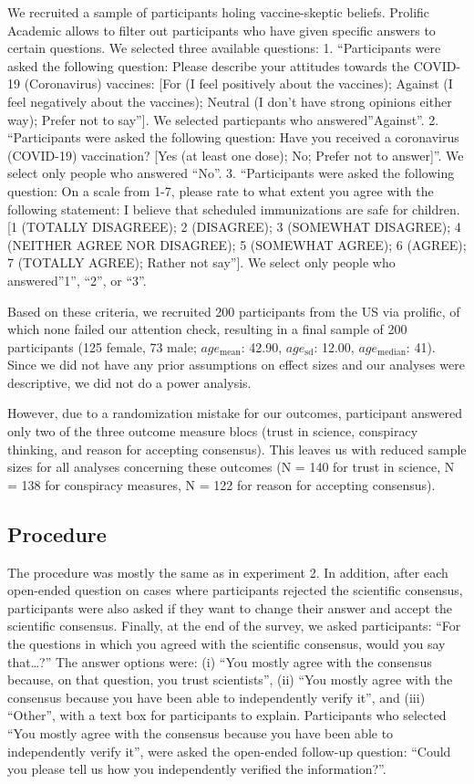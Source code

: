 \documentclass[
  doc,floatsintext]{apa6}
\begin{document}
We recruited a sample of participants holing vaccine-skeptic beliefs. Prolific Academic allows to filter out participants who have given specific answers to certain questions. We selected three available questions: 1. ``Participants were asked the following question: Please describe your attitudes towards the COVID-19 (Coronavirus) vaccines: {[}For (I feel positively about the vaccines); Against (I feel negatively about the vaccines); Neutral (I don't have strong opinions either way); Prefer not to say''{]}. We selected particpants who answered''Against''. 2. ``Participants were asked the following question: Have you received a coronavirus (COVID-19) vaccination? {[}Yes (at least one dose); No; Prefer not to answer{]}''. We select only people who answered ``No''. 3. ``Participants were asked the following question: On a scale from 1-7, please rate to what extent you agree with the following statement: I believe that scheduled immunizations are safe for children. {[}1 (TOTALLY DISAGREEE); 2 (DISAGREE); 3 (SOMEWHAT DISAGREE); 4 (NEITHER AGREE NOR DISAGREE); 5 (SOMEWHAT AGREE); 6 (AGREE); 7 (TOTALLY AGREE); Rather not say''{]}. We select only people who answered''1'', ``2'', or ``3''.

Based on these criteria, we recruited 200 participants from the US via prolific, of which none failed our attention check, resulting in a final sample of 200 participants (125 female, 73 male; \(age_\text{mean}\): 42.90, \(age_\text{sd}\): 12.00, \(age_\text{median}\): 41). Since we did not have any prior assumptions on effect sizes and our analyses were descriptive, we did not do a power analysis.

However, due to a randomization mistake for our outcomes, participant answered only two of the three outcome measure blocs (trust in science, conspiracy thinking, and reason for accepting consensus). This leaves us with reduced sample sizes for all analyses concerning these outcomes (N = 140 for trust in science, N = 138 for conspiracy measures, N = 122 for reason for accepting consensus).

\subsection{Procedure}\label{procedure-2}

The procedure was mostly the same as in experiment 2. In addition, after each open-ended question on cases where participants rejected the scientific consensus, participants were also asked if they want to change their answer and accept the scientific consensus. Finally, at the end of the survey, we asked participants: ``For the questions in which you agreed with the scientific consensus, would you say that\ldots?'' The answer options were: (i) ``You mostly agree with the consensus because, on that question, you trust scientists'', (ii) ``You mostly agree with the consensus because you have been able to independently verify it'', and (iii) ``Other'', with a text box for participants to explain. Participants who selected ``You mostly agree with the consensus because you have been able to independently verify it'', were asked the open-ended follow-up question: ``Could you please tell us how you independently verified the information?''.
\end{document}

